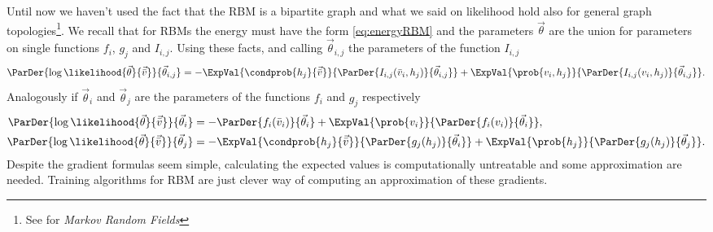   Until now we haven't used the fact that the RBM is a bipartite graph and what we said on likelihood
  hold also for general graph topologies\footnote{See \cite{fischer2012introduction} for \emph{Markov
  Random Fields}}.
  We recall that for RBMs the energy must have the form \eqref{eq:energyRBM} and the parameters \(\vec{\theta}\) are the union for parameters on single functions \(f_i\), \(g_j\) and \(I_{i,j}\).
  Using these facts, and calling \(\vec{\theta}_{i,j}\) the parameters of the function \(I_{i,j}\)
  \[
    \ParDer{\log\likelihood{\vec{\theta}}{\vec{\bar{v}}}}{\vec{\theta}_{i,j}} 
      = -\ExpVal{\condprob{h_j}{\vec{\bar{v}}}}{\ParDer{I_{i,j}(\bar{v}_i,h_j)}{\vec{\theta}_{i,j}}}
        +\ExpVal{\prob{v_i,h_j}}{\ParDer{I_{i,j}(v_i,h_j)}{\vec{\theta}_{i,j}}}.
  \]
  Analogously if \(\vec{\theta}_i\) and \(\vec{\theta}_j\) are the parameters of the functions
  \(f_i\) and \(g_j\) respectively
  \begin{align*}
    \ParDer{\log\likelihood{\vec{\theta}}{\vec{\bar{v}}}}{\vec{\theta}_i} 
    &= -\ParDer{f_i(\bar{v}_i)}{\vec{\theta}_i}
       +\ExpVal{\prob{v_i}}{\ParDer{f_i(v_i)}{\vec{\theta}_i}}, \\
    \ParDer{\log\likelihood{\vec{\theta}}{\vec{\bar{v}}}}{\vec{\theta}_j} 
    &= -\ExpVal{\condprob{h_j}{\vec{\bar{v}}}}{\ParDer{g_j(h_j)}{\vec{\theta}_i}}
       +\ExpVal{\prob{h_j}}{\ParDer{g_j(h_j)}{\vec{\theta}_j}}.
  \end{align*}
  Despite the gradient formulas seem simple, calculating the expected values is computationally
  untreatable and some approximation are needed. Training algorithms for RBM are just clever way
  of computing an approximation of these gradients.
  
